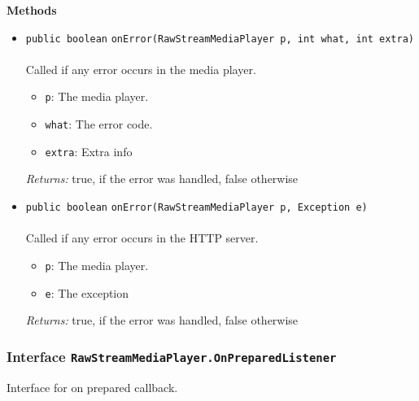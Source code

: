 \textbf{\sffamily Methods}
\begin{itemize}
\item \lstinline|public boolean| \lstinline|onError|\lstinline|(RawStreamMediaPlayer p, int what, int extra)|\\ \\[-0.6em]
Called if any error occurs in the media player.
\begin{itemize}
\item \lstinline|p|: The media player.
\item \lstinline|what|: The error code.
\item \lstinline|extra|: Extra info
\end{itemize}

\emph{Returns:} true, if the error was handled, false otherwise

\item \lstinline|public boolean| \lstinline|onError|\lstinline|(RawStreamMediaPlayer p, Exception e)|\\ \\[-0.6em]
Called if any error occurs in the HTTP server.
\begin{itemize}
\item \lstinline|p|: The media player.
\item \lstinline|e|: The exception
\end{itemize}

\emph{Returns:} true, if the error was handled, false otherwise

\end{itemize}

\subsubsection{Interface \lstinline|RawStreamMediaPlayer.OnPreparedListener|}
Interface for on prepared callback. \\
\noindent\begin{minipage}[t]{5cm}
\vspace{0.3em}
\hspace*{2em}
\vspace{0.3em}
\end{minipage}





